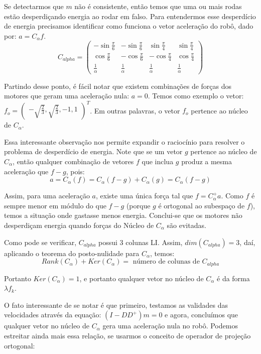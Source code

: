 \documentclass{article}
\begin{document}
\hspace{1cm}Se detectarmos que $m$ não é consistente, então temos que uma ou mais rodas estão desperdiçando energia ao rodar em falso. Para entendermos esse desperdício de energia precisamos identificar como funciona o vetor aceleração do robô, dado por: $ a = C_{\alpha}f$.
\[C_{alpha}
=
\begin{pmatrix}
  -\sin{\frac{\pi}{6}} & -\sin{\frac{\pi}{6}} & \sin{\frac{\pi}{4}} & \sin{\frac{\pi}{4}} \\
  \cos{\frac{\pi}{6}} &  -\cos{\frac{\pi}{6}} &  -\cos{\frac{\pi}{4}} &  \cos{\frac{\pi}{4}} \\
 \frac{1}{\alpha} & \frac{1}{\alpha} &\frac{1}{\alpha} & \frac{1}{\alpha}
 \end{pmatrix}
\]

Partindo desse ponto, é fácil notar que existem combinações de forças dos motores que geram uma aceleração nula: $ a = 0 $. Temos como exemplo o vetor: $f_{o} = \begin{pmatrix} -\sqrt{\frac{2}{3}},\sqrt{\frac{2}{3}},-1,1\end{pmatrix}^T$. Em outras palavras, o vetor $f_{o}$ pertence ao núcleo de $C_{\alpha}$.

Essa interessante observação nos permite expandir o raciocínio para resolver o problema de desperdício de energia. Note que se um vetor $g$ pertence ao núcleo de $C_{\alpha}$, então qualquer combinação de vetores $f$ que inclua $g$ produz a mesma aceleração que $f - g$, pois:
\[ a = C_{\alpha}(f) = C_{\alpha}(f-g) + C_{\alpha}(g) = C_{\alpha}(f-g)\]

Assim, para uma aceleração $a$, existe uma única força tal que $f=C_{\alpha}^+a$. Como $f$ é sempre menor em módulo do que $f-g$ (porque $g$ é ortogonal ao subespaço de $f$), temos a situação onde gastasse menos energia. Conclui-se que os motores não desperdiçam energia quando forças do Núcleo de $C_{\alpha}$ são evitadas.

Como pode se verificar, $C_{alpha}$ possui 3 colunas LI. Assim, $dim(C_{alpha}) = 3$, daí, aplicando o teorema do posto-nulidade para $C_{\alpha}$, temos:
\[Rank(C_{\alpha}) + Ker(C_{\alpha}) = \text{ número de colunas de }C_{alpha}\]


Portanto $Ker(C_{\alpha}) = 1 $, e portanto qualquer vetor no núcleo de $C_{\alpha}$ é da forma $\lambda f_{k}$.

O fato interessante de se notar é que primeiro, testamos as validades das velocidades através da equação: $(I-DD^+)m = 0$ e agora, concluímos que qualquer vetor no núcleo de $C_{\alpha}$ gera uma aceleração nula no robô. Podemos estreitar ainda mais essa relação, se usarmos o conceito de operador de projeção ortogonal:
\end{document}
